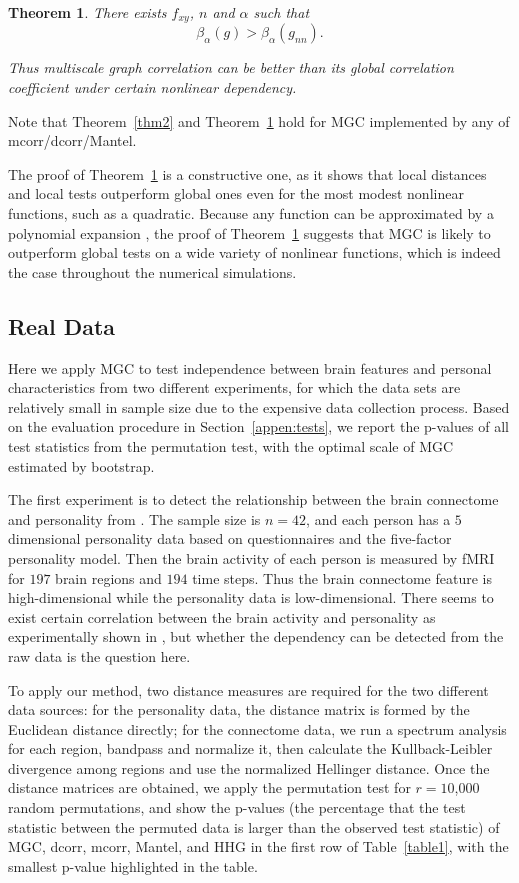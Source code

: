 \documentclass[11pt]{article}
\newtheorem{thm}{Theorem}
\begin{document}
\begin{thm}
\label{thm3}
There exists $f_{xy}$, $n$ and $\alpha$ such that 
\begin{equation}
\beta_{\alpha}(g) > \beta_{\alpha}(g_{nn}).
\end{equation}

Thus multiscale graph correlation can be better than its global correlation coefficient under certain nonlinear dependency.
\end{thm}
Note that Theorem~\ref{thm2} and Theorem~\ref{thm3} hold for MGC implemented by any of mcorr/dcorr/Mantel.

The proof of Theorem~\ref{thm3} is a constructive one, as it shows that local distances and local tests outperform global ones even for the most modest nonlinear functions, such as a quadratic.  Because any function can be approximated by a polynomial expansion \cite{RudinBook}, the proof of Theorem~\ref{thm3} suggests that MGC is likely to outperform global tests on a wide variety of nonlinear functions, which is indeed the case throughout the numerical simulations.

\subsection{Real Data}
\label{numer3}
Here we apply MGC to test independence between brain features and personal characteristics from two different experiments, for which the data sets are relatively small in sample size due to the expensive data collection process. Based on the evaluation procedure in Section~\ref{appen:tests}, we report the p-values of all test statistics from the permutation test, with the optimal scale of MGC estimated by bootstrap.

The first experiment is to detect the relationship between the brain connectome and personality from \cite{AdelsteinEtAl2011}. The sample size is $n=42$, and each person has a $5$ dimensional personality data based on questionnaires and the five-factor personality model. Then the brain activity of each person is measured by fMRI for $197$ brain regions and $194$ time steps. Thus the brain connectome feature is high-dimensional while the personality data is low-dimensional. There seems to exist certain correlation between the brain activity and personality as experimentally shown in \cite{AdelsteinEtAl2011}, but whether the dependency can be detected from the raw data is the question here.

To apply our method, two distance measures are required for the two different data sources: for the personality data, the distance matrix is formed by the Euclidean distance directly; for the connectome data, we run a spectrum analysis for each region, bandpass and normalize it, then calculate the Kullback-Leibler divergence among regions and use the normalized Hellinger distance. Once the distance matrices are obtained, we apply the permutation test for $r=10$,$000$ random permutations, and show the p-values (the percentage that the test statistic between the permuted data is larger than the observed test statistic) of MGC, dcorr, mcorr, Mantel, and HHG in the first row of Table~\ref{table1}, with the smallest p-value highlighted in the table. 
\end{document}
